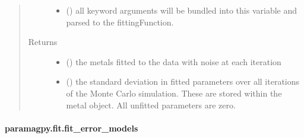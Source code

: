 \documentclass[a4paper,10pt,english,openany,oneside]{sphinxmanual}
\begin{document}
\begin{fulllineitems}
\begin{quote}
\begin{description}
\begin{itemize}
\item {} 
\sphinxAtStartPar
{} () \textendash{} all key\sphinxhyphen{}word arguments will be bundled into this variable and
parsed to the fittingFunction.

\end{itemize}

\item[{Returns}] \leavevmode
\sphinxAtStartPar
\begin{itemize}
\item {} 
\sphinxAtStartPar
{} () \textendash{} the metals fitted to the data with noise at each iteration

\item {} 
\sphinxAtStartPar
{} () \textendash{} the standard deviation in fitted parameters over all iterations of the
Monte Carlo simulation.
These are stored within the metal object. All unfitted parameters
are zero.

\end{itemize}


\end{description}\end{quote}

\end{fulllineitems}



\paragraph{paramagpy.fit.fit\_error\_models}
\label{\detokenize{reference/generated/paramagpy.fit.fit_error_models:paramagpy-fit-fit-error-models}}\label{\detokenize{reference/generated/paramagpy.fit.fit_error_models::doc}}
\end{document}
